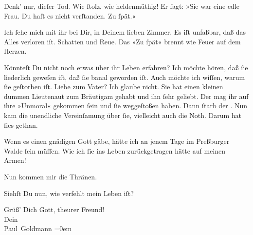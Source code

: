 \pstart
           Denk’ nur, dieſer Tod\textcolor{gray}{.} Wie ſtolz, wie heldenmüthig! Er ſagt: »Sie
               war eine edle Frau. Du haſt es nicht verſtanden. Zu ſpät.«\pend
           
\pstart
           Ich ſehe mich mit ihr bei Dir, in Deinem lieben {\pb}Zimmer. Es iſt unfaßbar, daß das Alles verloren iſt. Schatten und Reue. Das »Zu
               ſpät« brennt wie Feuer auf dem Herzen.\pend
           
\pstart
           Könnteſt Du nicht noch etwas über ihr Leben erfahren? Ich möchte hören, daß ſie liederlich geweſen iſt, daß
               ſie banal geworden iſt. Auch möchte ich wiſſen, \strikeout{\textcolor{gray}{×}} warum ſie geſtorben iſt. Liebe zum Vater? Ich glaube nicht. Sie hat einen kleinen dummen Lieutenaut zum Bräutigam gehabt und ihn ſehr
               geliebt. Der mag ihr auf ihre »Unmoral« gekommen ſein und ſie weggeſtoßen {\pb}haben. Dann ſtarb der \label{K_L02628-2v}\label{K_L02628-2}.
               Nun kam die unendliche Vereinſamung über ſie, vielleicht auch die Noth. Darum hat
               ſies gethan.\pend
           
\pstart
           Wenn es einen gnädigen Gott gäbe, hätte ich an jenem Tage im Preßburger Walde ſein müſſen. Wie ich ſie ins Leben
               zurückgetragen hätte auf meinen Armen!\pend
           
\pstart
           Nun kommen mir die Thränen.\pend
           
\pstart
           Siehſt Du nun, wie verfehlt mein Leben iſt?\pend
           
\pstart
           Grüß’ Dich Gott, theurer Freund!{\\[\baselineskip]}Dein{\\[\baselineskip]}\spacefill\mbox{Paul Goldmann}\pend
           \leftskip=0em{}\endnumbering{}  
      
